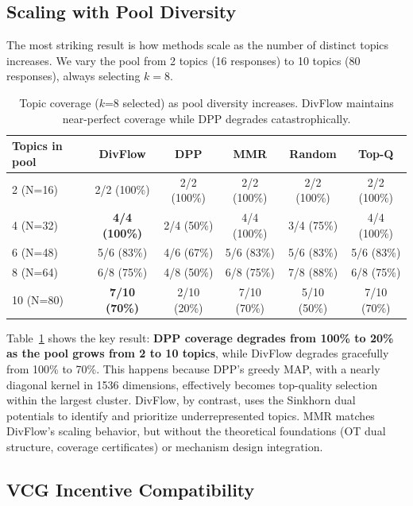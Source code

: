 \documentclass[10pt]{article}
\begin{document}
\subsection{Scaling with Pool Diversity}
\label{sec:scaling}

The most striking result is how methods scale as the number of distinct topics increases.
We vary the pool from 2 topics (16 responses) to 10 topics (80 responses), always selecting $k=8$.

\begin{table}[t]
\centering
\caption{Topic coverage ($k$=8 selected) as pool diversity increases. DivFlow maintains near-perfect coverage while DPP degrades catastrophically.}
\label{tab:scaling}
\begin{tabular}{lccccc}
\toprule
\textbf{Topics in pool} & \textbf{DivFlow} & \textbf{DPP} & \textbf{MMR} & \textbf{Random} & \textbf{Top-Q} \\
\midrule
2 (N=16)  & 2/2 (100\%) & 2/2 (100\%) & 2/2 (100\%) & 2/2 (100\%) & 2/2 (100\%) \\
4 (N=32)  & \textbf{4/4 (100\%)} & 2/4 (50\%)  & 4/4 (100\%) & 3/4 (75\%)  & 4/4 (100\%) \\
6 (N=48)  & 5/6 (83\%)  & 4/6 (67\%)  & 5/6 (83\%)  & 5/6 (83\%)  & 5/6 (83\%)  \\
8 (N=64)  & 6/8 (75\%)  & 4/8 (50\%)  & 6/8 (75\%)  & 7/8 (88\%)  & 6/8 (75\%)  \\
10 (N=80) & \textbf{7/10 (70\%)} & 2/10 (20\%) & 7/10 (70\%) & 5/10 (50\%) & 7/10 (70\%) \\
\bottomrule
\end{tabular}
\end{table}

Table~\ref{tab:scaling} shows the key result: \textbf{DPP coverage degrades from 100\% to 20\% as the pool grows from 2 to 10 topics}, while DivFlow degrades gracefully from 100\% to 70\%.
This happens because DPP's greedy MAP, with a nearly diagonal kernel in 1536 dimensions, effectively becomes top-quality selection within the largest cluster.
DivFlow, by contrast, uses the Sinkhorn dual potentials to identify and prioritize underrepresented topics.
MMR matches DivFlow's scaling behavior, but without the theoretical foundations (OT dual structure, coverage certificates) or mechanism design integration.

\subsection{VCG Incentive Compatibility}
\label{sec:ic-results}
\end{document}
